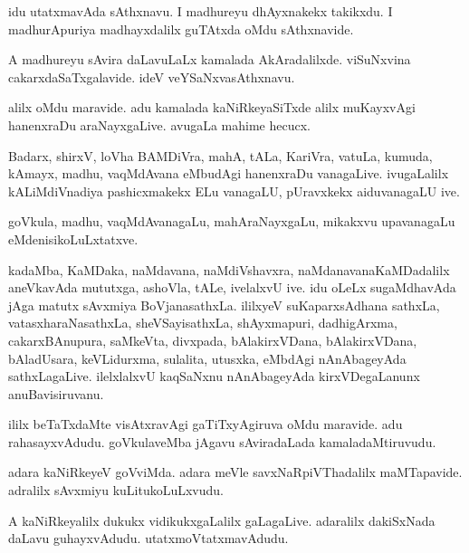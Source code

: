 \documentclass{article}
\begin{document}
\begin{mn}%
idu utatxmavAda sAthxnavu. I madhureyu dhAyxnakekx takikxdu. I madhurApuriya madhayxdalilx 
guTAtxda oMdu sAthxnavide.
\end{mn}

\begin{mn}%
A madhureyu sAvira daLavuLaLx kamalada AkAradalilxde. viSuNxvina cakarxdaSaTxgalavide. ideV 
veYSaNxvasAthxnavu.
\end{mn}

\begin{mn}%
alilx oMdu maravide. adu kamalada kaNiRkeyaSiTxde alilx muKayxvAgi hanenxraDu 
araNayxgaLive. avugaLa mahime hecucx.
\end{mn}

\begin{mn}%
Badarx, shirxV, loVha BAMDiVra, mahA, tALa, KariVra, vatuLa, kumuda, kAmayx, madhu, 
vaqMdAvana eMbudAgi hanenxraDu vanagaLive. ivugaLalilx kALiMdiVnadiya pashicxmakekx ELu
vanagaLU, pUravxkekx aiduvanagaLU ive.
\end{mn}

\begin{mn}%
goVkula, madhu, vaqMdAvanagaLu, mahAraNayxgaLu, mikakxvu upavanagaLu eMdenisikoLuLxtatxve.
\end{mn}

\begin{mn}%
kadaMba, KaMDaka, naMdavana, naMdiVshavxra, naMdanavanaKaMDadalilx aneVkavAda mututxga, 
ashoVla, tALe, ivelalxvU ive. idu oLeLx sugaMdhavAda jAga matutx sAvxmiya BoVjanasathxLa. 
ililxyeV suKaparxsAdhana sathxLa, vatasxharaNasathxLa, sheVSayisathxLa, shAyxmapuri, 
dadhigArxma, cakarxBAnupura, saMkeVta, divxpada, bAlakirxVDana, bAlakirxVDana, bAladUsara, 
keVLidurxma, sulalita, utusxka, eMbdAgi nAnAbageyAda sathxLagaLive. ilelxlalxvU kaqSaNxnu 
nAnAbageyAda kirxVDegaLanunx anuBavisiruvanu.
\end{mn}

\begin{mn}%
ililx beTaTxdaMte visAtxravAgi gaTiTxyAgiruva oMdu maravide. adu rahasayxvAdudu. 
goVkulaveMba jAgavu sAviradaLada kamaladaMtiruvudu.
\end{mn}

\begin{mn}%
adara kaNiRkeyeV goVviMda. adara meVle savxNaRpiVThadalilx maMTapavide. adralilx sAvxmiyu 
kuLitukoLuLxvudu.
\end{mn}

\begin{mn}%
A kaNiRkeyalilx dukukx vidikukxgaLalilx gaLagaLive. adaralilx dakiSxNada daLavu 
guhayxvAdudu. utatxmoVtatxmavAdudu.
\end{mn}
\end{document}
